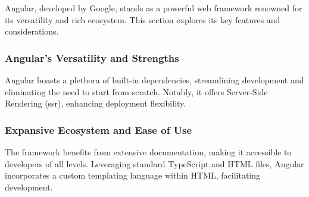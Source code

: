 




Angular, developed by Google, stands as a powerful web framework renowned for its versatility and rich ecosystem. This section explores its key features and considerations.

\subsubsection{Angular's Versatility and Strengths}

Angular boasts a plethora of built-in dependencies, streamlining development and eliminating the need to start from scratch. Notably, it offers Server-Side Rendering (\acrshort{ssr}), enhancing deployment flexibility.

\subsubsection{Expansive Ecosystem and Ease of Use}

The framework benefits from extensive documentation, making it accessible to developers of all levels. Leveraging standard TypeScript and HTML files, Angular incorporates a custom templating language within HTML, facilitating development.

